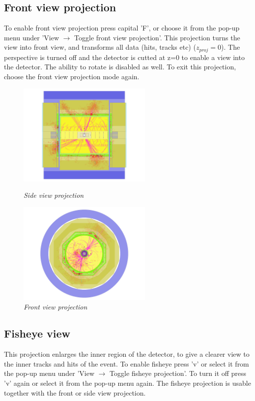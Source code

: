 \documentclass[a4paper,10pt]{article}
\begin{document}
\subsection{Front view projection}
To enable front view projection press capital 'F', or choose it from the pop-up menu under 'View $\rightarrow$ Toggle front view projection'. This projection turns the view into front view, and transforms all data (hits, tracks etc)
($z_{proj} = 0$). The perspective is turned off and the detector is cutted at z=0 to enable a view into the detector. The ability to rotate is disabled as well. To exit this projection, choose the front view projection mode again. 

\begin{figure}[h!]
\begin{minipage}[t]{6cm}
\centerline{\includegraphics[height=5cm]{sideview2.png}}
\caption{\label{CEDViewer} \textsl{Side view projection}}
\end{minipage}
\hfill
\begin{minipage}[t]{6cm}
\setlength{\fboxsep}{0mm}
\centerline{\includegraphics[height=5cm]{frontview2.png}}
\caption{\label{DSTViewer}\textsl{Front view projection}}
\end{minipage}
\end{figure}

\subsection{Fisheye view}
This projection enlarges the inner region of the detector, to give a clearer view to the inner tracks and hits of the event. To enable fisheye press 'v' or select it from the pop-up menu under 'View $\rightarrow$ Toggle fisheye projection'. To turn it off press 'v' again or select it from the pop-up menu again. The fisheye projection is usable together with the front or side view projection.
\end{document}
